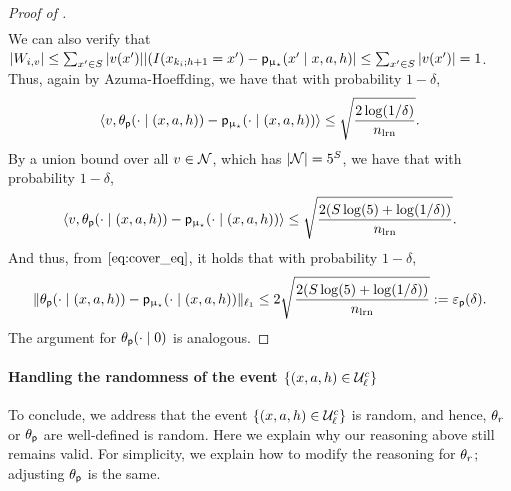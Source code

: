 \begin{proof}[Proof of ]
\begin{align*}
	\end{align*}
	We can also verify that $|W_{i,v}| \le \sum_{x'\in S} |v(x')| |(I(x_{k_i;h+1} =x') - \mathsf{p}_{\upmu_{\star}}(x' \mid x,a,h)| \le\sum_{x'\in S} |v(x')| = 1 $.  Thus, again by Azuma-Hoeffding, we have that with probability $1 - \delta$,
	\begin{align*}
	\langle v, \theta_{\mathsf{p}}(\cdot \mid (x,a,h)) - \mathsf{p}_{\upmu_{\star}}(\cdot \mid (x,a,h))\rangle \le \sqrt{ \frac{2\log(1/\delta)}{n_{\mathrm{lrn}}}}.
	\end{align*}
	By a union bound over all $v \in \mathcal{N}$, which has $|\mathcal{N}| = 5^{S}$, we have that with probability $1 - \delta$,
	\begin{align*}
	\langle v, \theta_{\mathsf{p}}(\cdot \mid (x,a,h)) - \mathsf{p}_{\upmu_{\star}}(\cdot \mid (x,a,h))\rangle \le \sqrt{ \frac{2(S\log(5) + \log(1/\delta))}{n_{\mathrm{lrn}}}}.
	\end{align*}
	And thus, from $\Cref{eq:cover_eq}$, it holds that with probability $1- \delta$,
	\begin{align*}
	\|\theta_{\mathsf{p}}(\cdot \mid (x,a,h)) - \mathsf{p}_{\upmu_{\star}}(\cdot \mid (x,a,h))\|_{\ell_1} \le 2\sqrt{ \frac{2(S\log(5) + \log(1/\delta))}{n_{\mathrm{lrn}}}} := \varepsilon_{\mathsf{p}}(\delta).
	\end{align*}
	The argument for $\theta_{\mathsf{p}}(\cdot \mid 0)$ is analogous.
	\end{proof}


\paragraph{Handling the randomness of the event $\{(x,a,h) \in \mathcal{U}_{\ell}^c\}$} To conclude, we address that the event $\{(x,a,h) \in \mathcal{U}_{\ell}^c\}$ is random, and hence, $\theta_r$ or $\theta_{\mathsf{p}}$ are well-defined is random. Here we explain why our reasoning above still remains valid. For simplicity, we explain how to modify the reasoning for $\theta_r$; adjusting $\theta_{\mathsf{p}}$ is the same.

